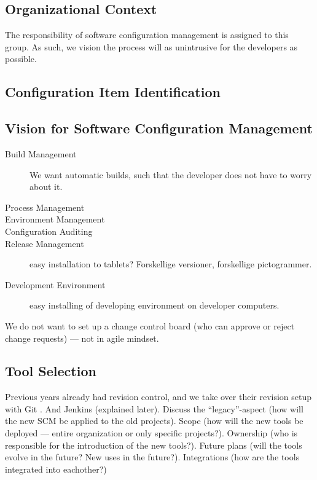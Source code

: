 \subsection{Organizational Context}
The responsibility of software configuration management is assigned to this group. As such, we vision the process will as unintrusive for the developers as possible.
\dummy~\dummy

\subsection{Configuration Item Identification}
\dummy

\subsection{Vision for Software Configuration Management}
\dummy
\begin{description}
  \item[Build Management] We want automatic builds, such that the developer does not have to worry about it.
  \item[Process Management] 
  \item[Environment Management] 
  \item[Configuration Auditing] 
  \item[Release Management] easy installation to tablets? Forskellige versioner, forskellige pictogrammer.
  \item[Development Environment] easy installing of developing environment on developer computers.
\end{description}

We do not want to set up a change control board (who can approve or reject change requests) --- not in agile mindset.

\subsection{Tool Selection}
Previous years already had revision control, and we take over their revision setup with Git \parencite{gitwebsite}. And Jenkins (explained later). Discuss the ``legacy''-aspect (how will the new SCM be applied to the old projects). Scope (how will the new tools be deployed --- entire organization or only specific projects?). Ownership (who is responsible for the introduction of the new tools?). Future plans (will the tools evolve in the future? New uses in the future?). Integrations (how are the tools integrated into eachother?)


